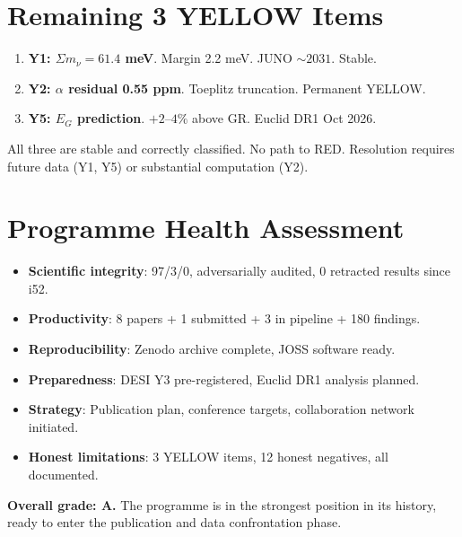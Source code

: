\documentclass[11pt,a4paper]{article}
\begin{document}
\section{Remaining 3 YELLOW Items}

\begin{enumerate}
\item \textbf{Y1: $\Sigma m_\nu = 61.4$ meV}. Margin 2.2 meV. JUNO $\sim 2031$. Stable.
\item \textbf{Y2: $\alpha$ residual 0.55 ppm}. Toeplitz truncation. Permanent YELLOW.
\item \textbf{Y5: $E_G$ prediction}. $+2$--$4\%$ above GR. Euclid DR1 Oct 2026.
\end{enumerate}

All three are stable and correctly classified. No path to RED. Resolution requires future data (Y1, Y5) or substantial computation (Y2).

\section{Programme Health Assessment}

\begin{tcolorbox}[colback=green!5!white, colframe=dfdgreen, title=\textbf{Programme Health: EXCELLENT}]
\begin{itemize}[nosep]
\item \textbf{Scientific integrity}: 97/3/0, adversarially audited, 0 retracted results since i52.
\item \textbf{Productivity}: 8 papers + 1 submitted + 3 in pipeline + 180 findings.
\item \textbf{Reproducibility}: Zenodo archive complete, JOSS software ready.
\item \textbf{Preparedness}: DESI Y3 pre-registered, Euclid DR1 analysis planned.
\item \textbf{Strategy}: Publication plan, conference targets, collaboration network initiated.
\item \textbf{Honest limitations}: 3 YELLOW items, 12 honest negatives, all documented.
\end{itemize}

\textbf{Overall grade: A.} The programme is in the strongest position in its history, ready to enter the publication and data confrontation phase.
\end{tcolorbox}
\end{document}
